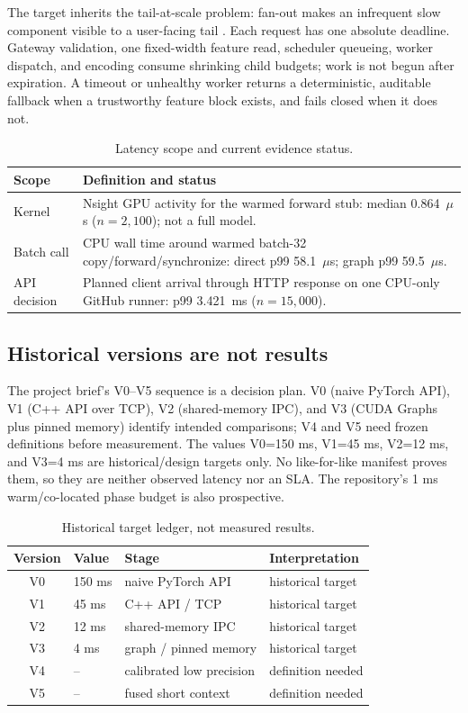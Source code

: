 \documentclass[10pt,a4paper,twocolumn]{article}
\begin{document}
The target inherits the tail-at-scale problem: fan-out makes an infrequent slow
component visible to a user-facing tail \cite{dean2013}. Each request has one
absolute deadline. Gateway validation, one fixed-width feature read, scheduler
queueing, worker dispatch, and encoding consume shrinking child budgets; work is
not begun after expiration. A timeout or unhealthy worker returns a deterministic,
auditable fallback when a trustworthy feature block exists, and fails closed
when it does not.

\begin{table}[t]\centering\small
\caption{Latency scope and current evidence status.}\label{tab:scopes}
\begin{tabularx}{\columnwidth}{@{}lY@{}}\toprule
Scope & Definition and status \\\midrule
Kernel & Nsight GPU activity for the warmed forward stub: median 0.864~$\mu$s
($n=2{,}100$); not a full model. \\
Batch call & CPU wall time around warmed batch-32 copy/forward/synchronize:
direct p99 58.1~$\mu$s; graph p99 59.5~$\mu$s. \\
API decision & Planned client arrival through HTTP response on one CPU-only
GitHub runner: p99 3.421~ms ($n=15{,}000$). \\\bottomrule
\end{tabularx}\end{table}

\subsection{Historical versions are not results}
The project brief's V0--V5 sequence is a decision plan. V0 (naive PyTorch API),
V1 (C++ API over TCP), V2 (shared-memory IPC), and V3 (CUDA Graphs plus pinned
memory) identify intended comparisons; V4 and V5 need frozen definitions before
measurement. The values V0=150 ms, V1=45 ms, V2=12 ms, and V3=4 ms are
historical/design targets only. No like-for-like manifest proves them, so they
are neither observed latency nor an SLA. The repository's 1 ms warm/co-located
phase budget is also prospective.

\begin{table}[t]\centering\small
\caption{Historical target ledger, not measured results.}\label{tab:targets}
\begin{tabularx}{\columnwidth}{@{}clYp{.27\columnwidth}@{}}\toprule
Version & Value & Stage & Interpretation \\\midrule
V0 & 150 ms & naive PyTorch API & historical target \\
V1 & 45 ms & C++ API / TCP & historical target \\
V2 & 12 ms & shared-memory IPC & historical target \\
V3 & 4 ms & graph / pinned memory & historical target \\
V4 & -- & calibrated low precision & definition needed \\
V5 & -- & fused short context & definition needed \\\bottomrule
\end{tabularx}\end{table}
\end{document}
